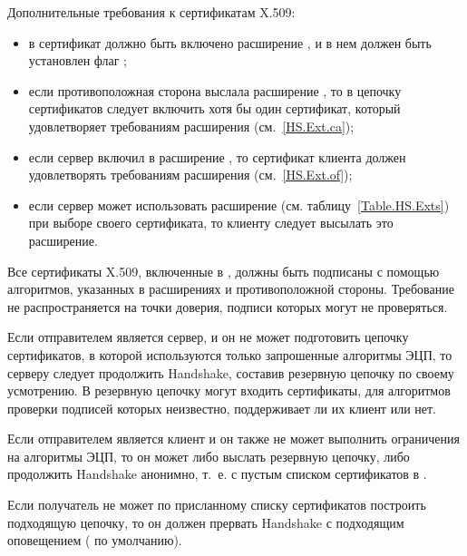 Дополнительные требования к сертификатам X.509:
%
\begin{itemize}
\item
в сертификат должно быть включено расширение , и в нем должен 
быть установлен флаг ; 

\item
если противоположная сторона выслала расширение 
, то в цепочку сертификатов 
 следует включить хотя бы один сертификат, который 
удовлетворяет требованиям расширения (см.~\ref{HS.Ext.ca});

\item
если сервер включил в  расширение 
, то сертификат клиента должен удовлетворять 
требованиям расширения (см.~\ref{HS.Ext.of});

\item
если сервер может использовать расширение  
(см. таблицу~\ref{Table.HS.Exts}) при выборе своего сертификата, то клиенту 
следует высылать это расширение.
\end{itemize}


Все сертификаты X.509, включенные в , должны быть 
подписаны с помощью алгоритмов, указанных в расширениях 
 и 
 противоположной стороны. 
%
Требование не распространяется на точки доверия, подписи которых могут не 
проверяться.

Если отправителем  является сервер, и он не может 
подготовить цепочку сертификатов, в которой используются только запрошенные 
алгоритмы ЭЦП, то серверу следует продолжить Handshake, составив резервную 
цепочку по своему усмотрению.
%
В резервную цепочку могут входить сертификаты, для алгоритмов проверки подписей 
которых неизвестно, поддерживает ли их клиент или нет.

Если отправителем  является клиент и он также не 
может выполнить ограничения на алгоритмы ЭЦП, то он может либо выслать 
резервную цепочку, либо продолжить Handshake анонимно, т.~е. с пустым списком 
сертификатов в .

Если получатель  не может по присланному списку 
сертификатов построить подходящую цепочку, то он должен прервать Handshake
с подходящим оповещением ( по умолчанию).

